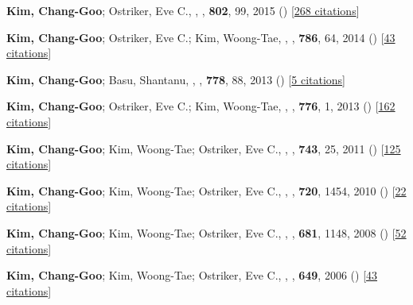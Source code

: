 \item[{8.}]\textbf{Kim, Chang-Goo}; Ostriker, Eve C., , \apj, \textbf{802}, 99, 2015 () [\href{http://adsabs.harvard.edu/abs/2015ApJ...802...99K}{268 citations}]

\item[{9.}]\textbf{Kim, Chang-Goo}; Ostriker, Eve C.; Kim, Woong-Tae, , \apj, \textbf{786}, 64, 2014 () [\href{http://adsabs.harvard.edu/abs/2014ApJ...786...64K}{43 citations}]

\item[{10.}]\textbf{Kim, Chang-Goo}; Basu, Shantanu, , \apj, \textbf{778}, 88, 2013 () [\href{http://adsabs.harvard.edu/abs/2013ApJ...778...88K}{5 citations}]

\item[{11.}]\textbf{Kim, Chang-Goo}; Ostriker, Eve C.; Kim, Woong-Tae, , \apj, \textbf{776}, 1, 2013 () [\href{http://adsabs.harvard.edu/abs/2013ApJ...776....1K}{162 citations}]

\item[{12.}]\textbf{Kim, Chang-Goo}; Kim, Woong-Tae; Ostriker, Eve C., , \apj, \textbf{743}, 25, 2011 () [\href{http://adsabs.harvard.edu/abs/2011ApJ...743...25K}{125 citations}]

\item[{13.}]\textbf{Kim, Chang-Goo}; Kim, Woong-Tae; Ostriker, Eve C., , \apj, \textbf{720}, 1454, 2010 () [\href{http://adsabs.harvard.edu/abs/2010ApJ...720.1454K}{22 citations}]

\item[{14.}]\textbf{Kim, Chang-Goo}; Kim, Woong-Tae; Ostriker, Eve C., , \apj, \textbf{681}, 1148, 2008 () [\href{http://adsabs.harvard.edu/abs/2008ApJ...681.1148K}{52 citations}]

\item[{15.}]\textbf{Kim, Chang-Goo}; Kim, Woong-Tae; Ostriker, Eve C., , \apj, \textbf{649}, 2006 () [\href{http://adsabs.harvard.edu/abs/2006ApJ...649L..13K}{43 citations}]